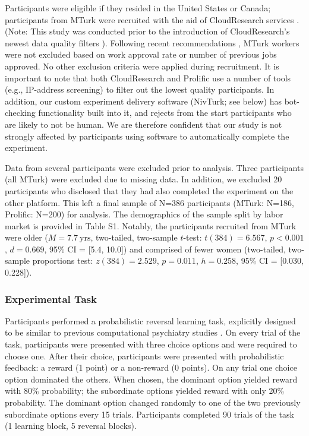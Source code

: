 \documentclass[a4paper,notitlepage,12pt]{article}
\begin{document}
Participants were eligible if they resided in the United States or Canada; participants from MTurk were recruited with the aid of CloudResearch services \cite{litman2017turkprime}. (Note: This study was conducted prior to the introduction of CloudResearch's newest data quality filters \cite{cloudresearch_2020}). Following recent recommendations \cite{robinson2019tapped}, MTurk workers were not excluded based on work approval rate or number of previous jobs approved. No other exclusion criteria were applied during recruitment. It is important to note that both CloudResearch and Prolific use a number of tools (e.g., IP-address screening) to filter out the lowest quality participants. In addition, our custom experiment delivery software (NivTurk; see below) has bot-checking functionality built into it, and rejects from the start participants who are likely to not be human. We are therefore confident that our study is not strongly affected by participants using software to automatically complete the experiment.

Data from several participants were excluded prior to analysis. Three participants (all MTurk) were excluded due to missing data. In addition, we excluded 20 participants who disclosed that they had also completed the experiment on the other platform. This left a final sample of N=386 participants (MTurk: N=186, Prolific: N=200) for analysis. The demographics of the sample split by labor market is provided in Table S1. Notably, the participants recruited from MTurk were older ($M = 7.7 \ \text{yrs}$, two-tailed, two-sample $t$-test: $t(384)=6.567$, $p<0.001$, $d=0.669$, 95\% CI = [5.4, 10.0]) and comprised of fewer women (two-tailed, two-sample proportions test: $z(384)=2.529$, $p=0.011$, $h=0.258$, 95\% CI = [0.030, 0.228]). 

\subsubsection*{Experimental Task}

Participants performed a probabilistic reversal learning task, explicitly designed to be similar to previous computational psychiatry studies \cite{waltz2007probabilistic, mukherjee_reward_2020}. On every trial of the task, participants were presented with three choice options and were required to choose one. After their choice, participants were presented with probabilistic feedback: a reward (1 point) or a non-reward (0 points). On any trial one choice option dominated the others. When chosen, the dominant option yielded reward with 80\% probability; the subordinate options yielded reward with only 20\% probability. The dominant option changed randomly to one of the two previously subordinate options every 15 trials. Participants completed 90 trials of the task (1 learning block, 5 reversal blocks). 
\end{document}
